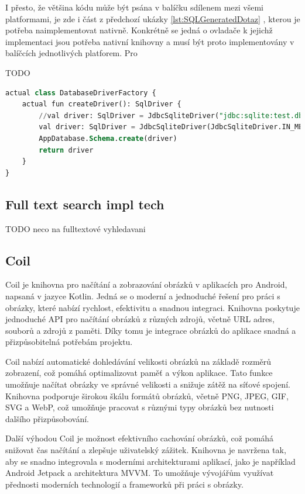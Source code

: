 I přesto, že většina kódu může být psána v balíčku sdílenem mezi všemi platformami, je zde i část z předchozí ukázky \ref{lst:SQLGeneratedDotaz}
, kterou je potřeba naimplementovat nativně. Konkrétně se jedná o ovladače k jejichž implementaci jsou potřeba nativní knihovny a musí
být proto implementovány v balíčcích jednotlivých platforem. Pro 

TODO
\begin{lstlisting}[caption={SQL vygenerovaný dotaz}, label={lst:SQLGeneratedDotaz}, language=SQL]
  actual class DatabaseDriverFactory {
    actual fun createDriver(): SqlDriver {
        //val driver: SqlDriver = JdbcSqliteDriver("jdbc:sqlite:test.db")
        val driver: SqlDriver = JdbcSqliteDriver(JdbcSqliteDriver.IN_MEMORY)
        AppDatabase.Schema.create(driver)
        return driver
    }
}
\end{lstlisting}


\subsection{Full text search impl tech} \label{fulltextSearch}
TODO
 neco na fulltextové vyhledavani


\subsection{Coil}
Coil je knihovna pro načítání a zobrazování obrázků v aplikacích pro Android, napsaná v jazyce Kotlin. Jedná se o moderní a jednoduché 
řešení pro práci s obrázky, které nabízí rychlost, efektivitu a snadnou integraci. Knihovna poskytuje jednoduché API pro načítání obrázků 
z různých zdrojů, včetně URL adres, souborů a zdrojů z paměti. Díky tomu je integrace obrázků do aplikace snadná a přizpůsobitelná potřebám projektu.

Coil nabízí automatické dohledávání velikosti obrázků na základě rozměrů zobrazení, což pomáhá optimalizovat paměť a výkon aplikace. Tato funkce 
umožňuje načítat obrázky ve správné velikosti a snižuje zátěž na síťové spojení. Knihovna podporuje širokou škálu formátů obrázků, včetně PNG, 
JPEG, GIF, SVG a WebP, což umožňuje pracovat s různými typy obrázků bez nutnosti dalšího přizpůsobování.

Další výhodou Coil je možnost efektivního cachování obrázků, což pomáhá snižovat čas načítání a zlepšuje uživatelský zážitek. Knihovna je navržena tak, 
aby se snadno integrovala s moderními architekturami aplikací, jako je například Android Jetpack a architektura MVVM. To umožňuje vývojářům využívat 
přednosti moderních technologií a frameworků při práci s obrázky.

